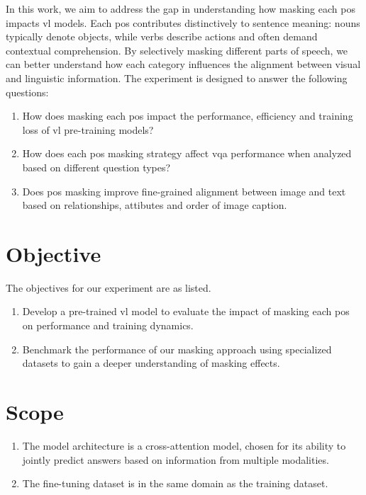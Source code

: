 In this work, we aim to address the gap in understanding how masking each \acrfull{pos} impacts \acrshort{vl} models.
Each \acrshort{pos} contributes distinctively to sentence meaning: nouns typically denote objects, while verbs describe actions and often demand contextual comprehension.
By selectively masking different parts of speech, we can better understand how each category influences the alignment between visual and linguistic information.
The experiment is designed to answer the following questions:
\begin{enumerate}
    \item How does masking each \acrshort{pos} impact the performance, efficiency and training loss of \acrshort{vl} pre-training models?
    \item How does each \acrshort{pos} masking strategy affect \acrfull{vqa} performance when analyzed based on different question types?
    \item Does \acrshort{pos} masking improve fine-grained alignment between image and text based on relationships, attibutes and order of image caption.
\end{enumerate}

\section{Objective}
The objectives for our experiment are as listed.
\begin{enumerate}
    \item Develop a pre-trained \acrshort{vl} model to evaluate the impact of masking each \acrshort{pos} on performance and training dynamics.
    \item Benchmark the performance of our masking approach using specialized datasets to gain a deeper understanding of masking effects.
\end{enumerate}

\section{Scope}
\begin{enumerate}
    \item The model architecture is a cross-attention model, chosen for its ability to jointly predict answers based on information from multiple modalities.
    \item The fine-tuning dataset is in the same domain as the training dataset.
\end{enumerate}


